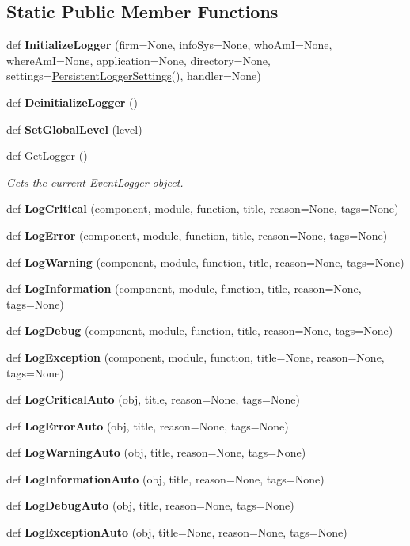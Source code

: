 \subsection*{Static Public Member Functions}
\begin{DoxyCompactItemize}
\item 
def {\bfseries Initialize\+Logger} (firm=None, info\+Sys=None, who\+AmI=None, where\+AmI=None, application=None, directory=None, settings=\hyperlink{classChronos_1_1EventLogger_1_1PersistentLoggerSettings}{Persistent\+Logger\+Settings}(), handler=None)
\item 
def {\bfseries Deinitialize\+Logger} ()
\item 
def {\bfseries Set\+Global\+Level} (level)
\item 
def \hyperlink{group__PyInfrastructure_ga22b169d02d02c1c7db9de09d26cf1319}{Get\+Logger} ()
\begin{DoxyCompactList}\small\item\em Gets the current \hyperlink{classChronos_1_1EventLogger_1_1EventLogger}{Event\+Logger} object. \end{DoxyCompactList}\item 
def {\bfseries Log\+Critical} (component, module, function, title, reason=None, tags=None)
\item 
def {\bfseries Log\+Error} (component, module, function, title, reason=None, tags=None)
\item 
def {\bfseries Log\+Warning} (component, module, function, title, reason=None, tags=None)
\item 
def {\bfseries Log\+Information} (component, module, function, title, reason=None, tags=None)
\item 
def {\bfseries Log\+Debug} (component, module, function, title, reason=None, tags=None)
\item 
def {\bfseries Log\+Exception} (component, module, function, title=None, reason=None, tags=None)
\item 
def {\bfseries Log\+Critical\+Auto} (obj, title, reason=None, tags=None)
\item 
def {\bfseries Log\+Error\+Auto} (obj, title, reason=None, tags=None)
\item 
def {\bfseries Log\+Warning\+Auto} (obj, title, reason=None, tags=None)
\item 
def {\bfseries Log\+Information\+Auto} (obj, title, reason=None, tags=None)
\item 
def {\bfseries Log\+Debug\+Auto} (obj, title, reason=None, tags=None)
\item 
def {\bfseries Log\+Exception\+Auto} (obj, title=None, reason=None, tags=None)
\end{DoxyCompactItemize}
